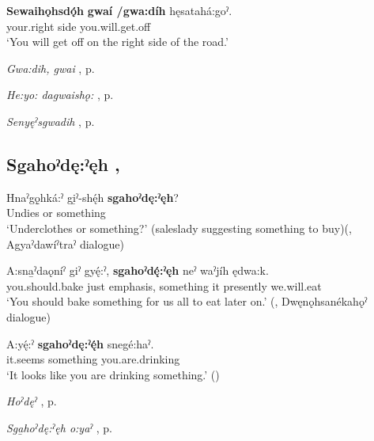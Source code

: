 \ea
\label{ex:spart5}
\gll \textbf{Sewaihǫhsdǫ́h} \textbf{gwaí /gwa:díh} hęsatahá:goˀ.\\
your.right side you.will.get.off\\
\glt ‘You will get off on the right side of the road.’
\z

\begin{CayugaRelated}
\item \textit{Gwa:dih, gwai} , p. \pageref{p:[gwa:dih]}\\
\item \textit{He:yo: dagwaishǫ:} , p. \pageref{p:[he:yo: dagwaishǫ:]}\\
\item \textit{Senyęˀsgwadih} , p. \pageref{p:[senyęˀsgwadih]}
\end{CayugaRelated}

\subsection*{\textbf{Sgahoˀdę:ˀęh} , } \label{p:[sgahoˀdę:ˀęh]}

\ea
\label{ex:spart6}
\gll Hnaˀgǫ̱hká:ˀ gi̱ˀ-shę́h \textbf{sgahoˀdę:ˀęh}?\\
Undies or something\\
\glt ‘Underclothes or something?’ (saleslady suggesting something to buy)(\cite[225]{mithun_watewayestanih_1984}, Agyaˀdawíˀtraˀ dialogue)
\z

\ea
\label{ex:spart7}
\gll A:sna̱ˀdaǫníˀ giˀ gyę́:ˀ, \textbf{sgahoˀdę́:ˀęh} neˀ waˀjíh ędwa:k.\\
you.should.bake just emphasis, something it presently we.will.eat\\
\glt ‘You should bake something for us all to eat later on.’ (\cite[225]{mithun_watewayestanih_1984}, Dwęnǫhsanékahǫˀ dialogue)
\z

\ea
\label{ex:spart8}
\gll A:yę́:ˀ \textbf{sgahoˀdę:ˀę́h} snegé:haˀ.\\
it.seems something you.are.drinking\\
\glt ‘It looks like you are drinking something.’ (\cite{carrier_legends_2013})
\z

\begin{CayugaRelated}
\item \textit{Hoˀdęˀ} , p. \pageref{p:[hoˀdęˀ]}\\
\item \textit{Sga̱hoˀdę:ˀęh o:yaˀ} , p. \pageref{p:[sgahoˀdę:ˀęh o:yaˀ]}
\end{CayugaRelated}

